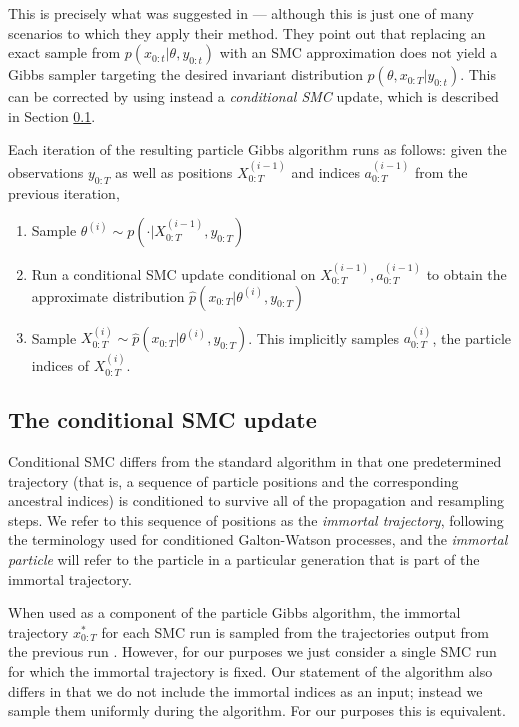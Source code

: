 \documentclass[fleqn]{article}
\theoremstyle{definition}
\begin{document}
This is precisely what was suggested in \citet{andrieu2010} --- although this is just one of many scenarios to which they apply their method.
They point out that replacing an exact sample from $p(x_{0:t} | \theta, y_{0:t})$ with an SMC approximation does not yield a Gibbs sampler targeting the desired invariant distribution $p(\theta, x_{0:T} | y_{0:t})$.
This can be corrected by using instead a \emph{conditional SMC} update, which is described in Section \ref{sec:condSMC_alg}.

Each iteration of the resulting particle Gibbs algorithm runs as follows: 
given the observations $y_{0:T}$ as well as positions $X_{0:T}^{(i-1)}$ and indices $a_{0:T}^{(i-1)}$ from the previous iteration,
\begin{enumerate}
\item Sample $\theta^{(i)} \sim p(\cdot | X_{0:T}^{(i-1)}, y_{0:T})$
\item Run a conditional SMC update conditional on $X_{0:T}^{(i-1)}, a_{0:T}^{(i-1)}$ to obtain the approximate distribution $\hat{p}(x_{0:T} | \theta^{(i)}, y_{0:T})$
\item Sample $X_{0:T}^{(i)} \sim \hat{p}(x_{0:T} | \theta^{(i)}, y_{0:T})$. This implicitly samples $a_{0:T}^{(i)}$, the particle indices of $X_{0:T}^{(i)}$.
\end{enumerate}

\subsection{The conditional SMC update}\label{sec:condSMC_alg}
Conditional SMC differs from the standard algorithm in that one predetermined trajectory (that is, a sequence of particle positions and the corresponding ancestral indices) is conditioned to survive all of the propagation and resampling steps. 
We refer to this sequence of positions as the \emph{immortal trajectory}, following the terminology used for conditioned Galton-Watson processes, and the \emph{immortal particle} will refer to the particle in a particular generation that is part of the immortal trajectory.

When used as a component of the particle Gibbs algorithm, the immortal trajectory $x_{0:T}^*$ for each SMC run is sampled from the trajectories output from the previous run \citep[Section 2.4.3]{andrieu2010}. However, for our purposes we just consider a single SMC run for which the immortal trajectory is fixed. 
Our statement of the algorithm also differs in that we do not include the immortal indices as an input; instead we sample them uniformly during the algorithm. For our purposes this is equivalent.
\end{document}
